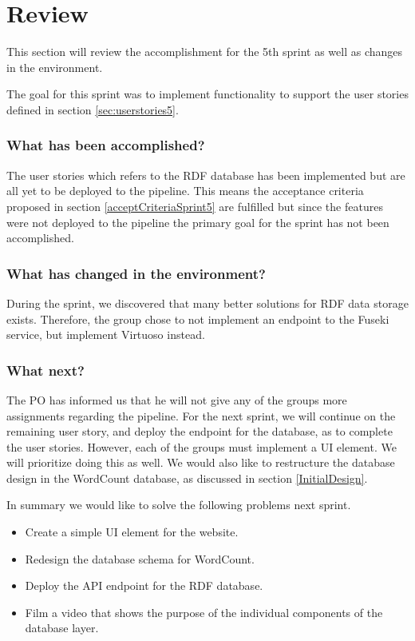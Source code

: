\section{Review}
This section will review the accomplishment for the 5th sprint as well as changes in the \knox{} environment. 

The goal for this sprint was to implement functionality to support the user stories defined in section \ref{sec:userstories5}. 

\subsubsection*{What has been accomplished?}
The user stories which refers to the RDF database has been implemented but are all yet to be deployed to the \knox{} pipeline. This means the acceptance criteria proposed in section \ref{acceptCriteriaSprint5} are fulfilled but since the features were not deployed to the pipeline the primary goal for the sprint has not been accomplished. 

\subsubsection*{What has changed in the environment?}
During the sprint, we discovered that many better solutions for RDF data storage exists. Therefore, the group chose to not implement an endpoint to the Fuseki service, but implement Virtuoso instead. 

\subsubsection*{What next?}
The PO has informed us that he will not give any of the \knox{} groups more assignments regarding the pipeline. 
For the next sprint, we will continue on the remaining user story, and deploy the endpoint for the database, as to complete the user stories. 
However, each of the \knox{} groups must implement a UI element. We will prioritize doing this as well.
We would also like to restructure the database design in the WordCount database, as discussed in section \ref{InitialDesign}.


In summary we would like to solve the following problems next sprint.

\begin{itemize}
    \item Create a simple UI element for the \knox{} website.
    \item Redesign the database schema for WordCount.
    \item Deploy the API endpoint for the RDF database.
    \item Film a video that shows the purpose of the individual components of the database layer.
\end{itemize}

